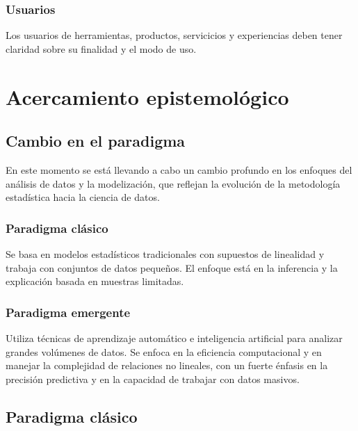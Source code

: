 \documentclass[
  letterpaper,
  DIV=11,
  numbers=noendperiod]{scrreprt}
\begin{document}
\subsection{Usuarios}\label{usuarios}

Los usuarios de herramientas, productos, servicicios y experiencias
deben tener claridad sobre su finalidad y el modo de uso.


\chapter{Acercamiento
epistemológico}\label{acercamiento-epistemoluxf3gico}

\section{Cambio en el paradigma}\label{cambio-en-el-paradigma}

En este momento se está llevando a cabo un cambio profundo en los
enfoques del análisis de datos y la modelización, que reflejan la
evolución de la metodología estadística hacia la ciencia de datos.

\subsection{Paradigma clásico}\label{paradigma-cluxe1sico}

Se basa en modelos estadísticos tradicionales con supuestos de
linealidad y trabaja con conjuntos de datos pequeños. El enfoque está en
la inferencia y la explicación basada en muestras limitadas.

\subsection{Paradigma emergente}\label{paradigma-emergente}

Utiliza técnicas de aprendizaje automático e inteligencia artificial
para analizar grandes volúmenes de datos. Se enfoca en la eficiencia
computacional y en manejar la complejidad de relaciones no lineales, con
un fuerte énfasis en la precisión predictiva y en la capacidad de
trabajar con datos masivos.

\section{Paradigma clásico}\label{paradigma-cluxe1sico-1}
\end{document}
